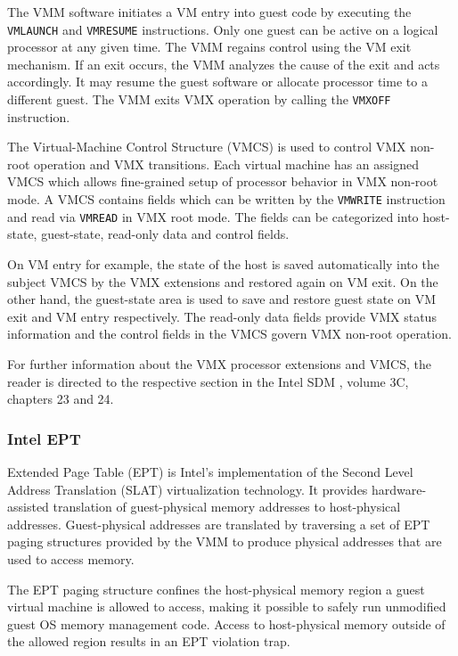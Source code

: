The VMM software initiates a VM entry into guest code by executing the
\texttt{VMLAUNCH} and \texttt{VMRESUME} instructions. Only one guest can be
active on a logical processor at any given time. The VMM regains control using
the VM exit mechanism. If an exit occurs, the VMM analyzes the cause of the
exit and acts accordingly. It may resume the guest software or allocate
processor time to a different guest. The VMM exits VMX operation by calling the
\texttt{VMXOFF} instruction.

The Virtual-Machine Control Structure (VMCS) is used to control VMX
non-root operation and VMX transitions. Each virtual machine has an assigned
VMCS which allows fine-grained setup of processor behavior in VMX non-root
mode. A VMCS contains fields which can be written by the
\texttt{VMWRITE} instruction and read via
\texttt{VMREAD} in VMX root mode. The fields can be categorized
into host-state, guest-state, read-only data and control fields.

On VM entry for example, the state of the host is saved automatically into the
subject VMCS by the VMX extensions and restored again on VM exit. On the other
hand, the guest-state area is used to save and restore guest state on VM exit
and VM entry respectively. The read-only data fields provide VMX status
information and the control fields in the VMCS govern VMX non-root operation.

For further information about the VMX processor extensions and VMCS, the reader
is directed to the respective section in the Intel SDM \cite{IntelSDM}, volume
3C, chapters 23 and 24.

\subsubsection{Intel EPT}\label{subsubsec:ept}
Extended Page Table (EPT) is Intel's implementation of the Second
Level Address Translation (SLAT) virtualization technology. It
provides hardware-assisted translation of guest-physical memory addresses to
host-physical addresses. Guest-physical addresses are translated by traversing a
set of EPT paging structures provided by the VMM to produce physical addresses
that are used to access memory.

The EPT paging structure confines the host-physical memory region a guest
virtual machine is allowed to access, making it possible to safely run
unmodified guest OS memory management code. Access to host-physical memory
outside of the allowed region results in an EPT violation trap.

